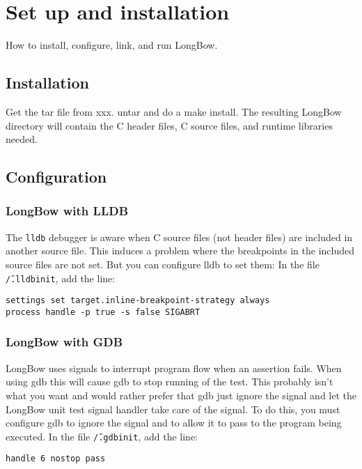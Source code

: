 \section{Set up and installation} 
How to install, configure, link, and run LongBow.

\subsection {Installation}
Get the tar file from xxx.
untar and do a make install.
The resulting LongBow directory will contain the C header files, C source files, and runtime libraries needed.

\subsection {Configuration}

\subsubsection{LongBow with LLDB}
The {\tt lldb} debugger is aware when C source files (not header files) are included in another source file.
This induces a problem where the breakpoints in the included source files are not set.
But you can configure lldb to set them: In the file {\tt \~/.lldbinit},
add the line:
 
\begin{lstlisting}
settings set target.inline-breakpoint-strategy always
process handle -p true -s false SIGABRT
\end{lstlisting}

\subsubsection{LongBow with GDB}
LongBow uses signals to interrupt program flow when an assertion fails.
When using gdb this will cause gdb to stop running of the test.
This probably isn't what you want and would rather prefer that gdb just
ignore the signal and let the LongBow unit test signal handler take care of the signal.
To do this, you must configure gdb to ignore the signal and to allow it to pass to the program being executed.
In the file {\tt \~/.gdbinit}, add the line:
 
\begin{lstlisting}
handle 6 nostop pass
\end{lstlisting}

